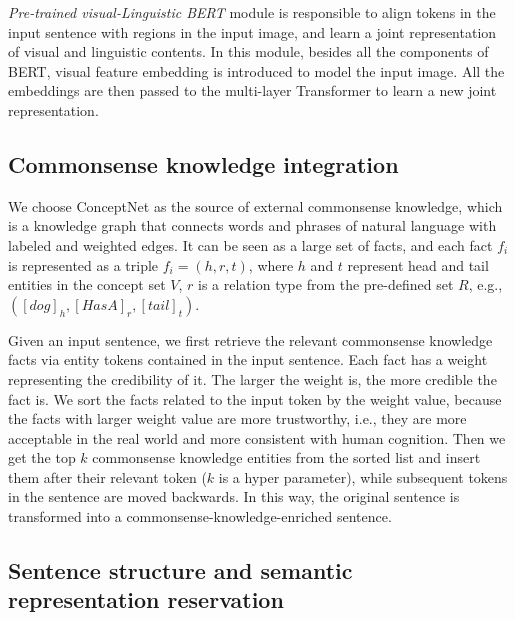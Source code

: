 \documentclass[conference]{IEEEtran}
\begin{document}
\emph{Pre-trained visual-Linguistic BERT} module is responsible to align tokens in the input sentence with regions in the input image, and learn a joint representation of visual and linguistic contents. In this module, besides all the components of BERT, visual feature embedding is introduced to model the input image. All the embeddings are then passed to the multi-layer Transformer to learn a new joint representation.

















\subsection{Commonsense knowledge integration}\label{B}

We choose ConceptNet as the source of external commonsense knowledge, which is a knowledge graph that connects words and phrases of natural language with labeled and weighted edges. It can be seen as a large set of facts, and each fact $f_i$ is represented as a triple $f_i=(h, r, t)$, where $h$ and $t$  represent head and tail entities in the concept set $V$, $r$ is a relation type from the pre-defined set $R$, e.g., $\left([{dog}]_{h},[{HasA}]_{r},[{tail}]_{t}\right)$. 





Given an input sentence, we first retrieve the relevant commonsense knowledge facts via entity tokens contained in the input sentence. Each fact has a weight representing the credibility of it. The larger the weight is, the more credible the fact is. We sort the facts related to the input token by the weight value, because the facts with larger weight value are more trustworthy, i.e., they are more acceptable in the real world and more consistent with human cognition. Then we get the top $k$ commonsense knowledge entities from the sorted list and insert them after their relevant token ($k$ is a hyper parameter), while subsequent tokens in the sentence are moved backwards. In this way, the original sentence is transformed into a commonsense-knowledge-enriched sentence.






\subsection{Sentence structure and semantic representation reservation}\label{C}
\end{document}

